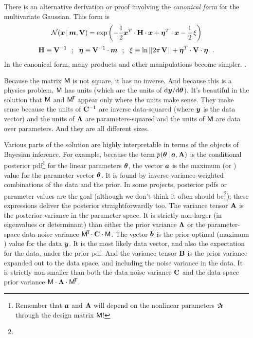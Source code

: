 There is an alternative derivation or proof involving the
\textsl{canonical form} for the multivariate Gaussian. This form is
\begin{equation}
\mathcal{N}\!\,(\boldsymbol{x}\,|\,\boldsymbol{m},\mathbf{V}) = \exp\left(-\frac{1}{2}\boldsymbol{x}^T \cdot\mathbf{H} \cdot \boldsymbol{x} + \boldsymbol{\eta}^T \cdot \boldsymbol{x} - \frac{1}{2}\,\xi\right)
\end{equation}
\begin{equation}
\mathbf{H}\equiv\mathbf{V}^{-1} ~~;~~
\boldsymbol{\eta}\equiv\mathbf{V}^{-1}\cdot\boldsymbol{m} ~~;~~
\xi\equiv\ln||2\pi\,\mathbf{V}||+\boldsymbol{\eta}^T\cdot\mathbf{V}\cdot\boldsymbol{\eta} ~~.
\end{equation}
In the canonical form, many products and other manipulations become
simpler. .

Because the matrix $\mathsf{M}$ is not square, it has no inverse. And because this
is a physics problem, $\mathsf{M}$ has units (which are the units of
$\mathrm{d}\boldsymbol{y}/\mathrm{d}\boldsymbol{\theta}$).
It's beautiful in the solution that $\mathsf{M}$ and $\mathsf{M}^{\!\mathsf{T}\!}$ appear only where the
units make sense.
They make sense because the units of $\mathbf{C}^{-1}$ are inverse data-squared (where $\boldsymbol{y}$
is the data vector) and the units of $\mathbf{\Lambda}$ are parameters-squared and the units
of $\mathsf{M}$ are data over parameters.
And they are all different sizes.

Various parts of the solution are highly interpretable in terms of the
objects of Bayesian inference. For example, because the term $p(\boldsymbol{\theta}\,|\,
\boldsymbol{a},\mathbf{A})$ is the conditional posterior pdf\footnote{Remember that $\boldsymbol{a}$ and
$\mathbf{A}$ will depend on the nonlinear parameters $\bP$ through the design matrix
$\mathsf{M}$!} for the linear parameters $\boldsymbol{\theta}$, the vector $\boldsymbol{a}$ is the maximum
 (or ) value for the parameter vector
$\boldsymbol{\theta}$.
It is found by inverse-variance-weighted combinations of the data and the prior.
In some projects, posterior pdfs or  parameter values are the goal
(although we don't think it often should be\footnote{}); these expressions
deliver the posterior straightforwardly too. 
The variance tensor $\mathbf{A}$ is the posterior variance in the parameter space.
It is strictly non-larger  (in eigenvalues or determinant) than either
the prior variance $\mathbf{\Lambda}$ or the parameter-space data-noise
variance $\mathsf{M}^{\!\mathsf{T}\!}\cdot\mathbf{C}\cdot\mathsf{M}$.
The vector $\boldsymbol{b}$ is the prior-optimal (maximum )
value for the data $\boldsymbol{y}$.
It is the most likely data vector, and also the expectation for the data,
under the prior pdf.
And the variance tensor $\mathbf{B}$ is the prior variance expanded out to the
data space, and including the noise variance in the data.
It is strictly non-smaller  than both the data noise variance $\mathbf{C}$ and the
data-space prior variance $\mathsf{M}\cdot\mathbf{\Lambda}\cdot\mathsf{M}^{\!\mathsf{T}\!}$.


